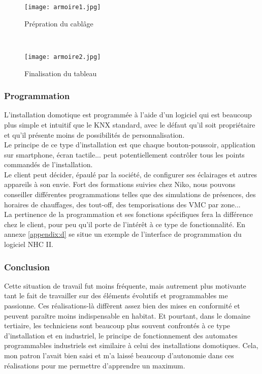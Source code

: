 \documentclass[a4paper, 12pt]{article}
\begin{document}
\begin{figure}[h]
    \begin{minipage}[c]{.46\linewidth}
        \centering
        \texttt{[image: armoire1.jpg]}
        \caption{Prépration du cablâge}
    \end{minipage}
~
    \begin{minipage}[c]{.46\linewidth}
        \centering
        \texttt{[image: armoire2.jpg]}
        \caption{Finalisation du tableau}
    \end{minipage}
\end{figure}

\subsubsection{Programmation}

L’installation domotique est programmée à l’aide d’un logiciel qui est beaucoup plus simple et intuitif que le KNX standard, avec le défaut qu’il soit propriétaire et qu’il présente moins de possibilités de personnalisation.\\Le principe de ce type d’installation est que chaque bouton-poussoir, application sur smartphone, écran tactile... peut potentiellement contrôler tous les points commandés de l’installation.\\

Le client peut décider, épaulé par la société, de configurer ses éclairages et autres appareils à son envie. Fort des formations suivies chez Niko, nous pouvons conseiller différentes programmations telles que des simulations de présences, des horaires de chauffages, des tout-off, des temporisations des VMC par zone...\\La pertinence de la programmation et ses fonctions spécifiques fera la différence chez le client, pour peu qu’il porte de l’intérêt à ce type de fonctionnalité. En annexe \ref{appendix:d} se situe un exemple de l'interface de programmation du logiciel NHC II.

\subsubsection{Conclusion}

Cette situation de travail fut moins fréquente, mais autrement plus motivante tant le fait de travailler sur des éléments évolutifs et programmables me passionne.
Ces réalisations-là diffèrent assez bien des mises en conformité et peuvent paraître moins indispensable en habitat. Et pourtant, dans le domaine tertiaire, les techniciens sont beaucoup plus souvent confrontés à ce type d’installation et en industriel, le principe de fonctionnement des automates programmables industriels est similaire à celui des installations domotiques.
Cela, mon patron l’avait bien saisi et m'a laissé beaucoup d’autonomie dans ces réalisations pour me permettre d’apprendre un maximum.
\end{document}
